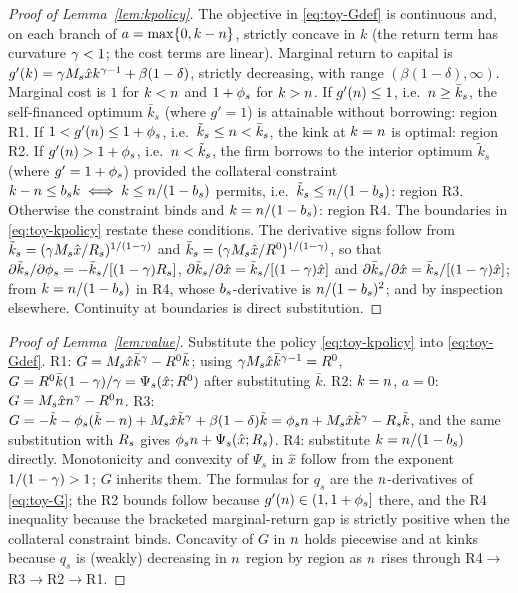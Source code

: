 \documentclass[12pt]{article}
\begin{document}
\begin{proof}[Proof of Lemma~\ref{lem:kpolicy}]
The objective in \eqref{eq:toy-Gdef} is continuous and, on each branch
of $a=\max\{0,k-n\}$, strictly concave in $k$ (the return term has
curvature $\gamma<1$; the cost terms are linear). Marginal return to
capital is $g'(k)=\gamma M_{s}\hat x k^{\gamma-1}+\beta(1-\delta)$,
strictly decreasing, with range $(\beta(1-\delta),\infty)$. Marginal
cost is $1$ for $k<n$ and $1+\phi_{s}$ for $k>n$. If
$g'(n)\leq 1$, i.e.\ $n\geq\bar k_{s}$, the self-financed
optimum $\bar k_{s}$ (where $g'=1$) is attainable without borrowing:
region R1. If $1<g'(n)\leq 1+\phi_{s}$, i.e.\
$\tilde k_{s}\leq n<\bar k_{s}$, the kink at $k=n$ is optimal:
region R2. If $g'(n)>1+\phi_{s}$, i.e.\ $n<\tilde k_{s}$, the
firm borrows to the interior optimum $\tilde k_{s}$ (where
$g'=1+\phi_{s}$) provided the collateral constraint
$k-n\leq b_{s}k \iff k\leq n/(1-b_{s})$ permits, i.e.\
$\tilde k_{s}\leq n/(1-b_{s})$: region R3. Otherwise the
constraint binds and $k=n/(1-b_{s})$: region R4. The
boundaries in \eqref{eq:toy-kpolicy} restate these conditions. The
derivative signs follow from
$\tilde k_{s}=(\gamma M_{s}\hat x/R_{s})^{1/(1-\gamma)}$ and
$\bar k_{s}=(\gamma M_{s}\hat x/R^{0})^{1/(1-\gamma)}$, so that
$\partial\tilde k_{s}/\partial\phi_{s}
=-\tilde k_{s}/[(1-\gamma)R_{s}]$,
$\partial\tilde k_{s}/\partial\hat x
=\tilde k_{s}/[(1-\gamma)\hat x]$ and
$\partial\bar k_{s}/\partial\hat x
=\bar k_{s}/[(1-\gamma)\hat x]$;
from $k=n/(1-b_{s})$ in R4, whose $b_{s}$-derivative is
$n/(1-b_{s})^{2}$; and by inspection elsewhere.
Continuity at boundaries is direct substitution.
\end{proof}
 
\begin{proof}[Proof of Lemma~\ref{lem:value}]
Substitute the policy \eqref{eq:toy-kpolicy} into
\eqref{eq:toy-Gdef}. R1: $G=M_{s}\hat x\bar k^{\gamma}-R^{0}\bar k$;
using $\gamma M_{s}\hat x\bar k^{\gamma-1}=R^{0}$,
$G=R^{0}\bar k(1-\gamma)/\gamma=\Psi_{s}(\hat x;R^{0})$ after
substituting $\bar k$. R2: $k=n$, $a=0$:
$G=M_{s}\hat xn^{\gamma}-R^{0}n$. R3:
$G=-\tilde k-\phi_{s}(\tilde k-n)
+M_{s}\hat x\tilde k^{\gamma}+\beta(1-\delta)\tilde k
=\phi_{s}n+M_{s}\hat x\tilde k^{\gamma}-R_{s}\tilde k$, and
the same substitution with $R_{s}$ gives
$\phi_{s}n+\Psi_{s}(\hat x;R_{s})$. R4: substitute
$k=n/(1-b_{s})$ directly. Monotonicity and convexity of
$\Psi_{s}$ in $\hat x$ follow from the exponent
$1/(1-\gamma)>1$; $G$ inherits them. The formulas for $q_{s}$ are the
$n$-derivatives of \eqref{eq:toy-G}; the R2 bounds follow because
$g'(n)\in(1,1+\phi_{s}]$ there, and the R4 inequality because the
bracketed marginal-return gap is strictly positive when the collateral
constraint binds. Concavity of $G$ in $n$ holds piecewise and at
kinks because $q_{s}$ is (weakly) decreasing in $n$ region by
region as $n$ rises through R4$\to$R3$\to$R2$\to$R1.
\end{proof}
 
\end{document}
